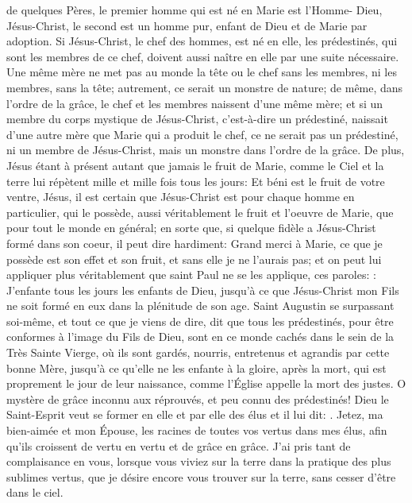 de quelques Pères, le premier homme qui est né en Marie est l'Homme- Dieu, Jésus-Christ, le second est un
homme pur, enfant de Dieu et de Marie par adoption. Si Jésus-Christ, le chef des hommes, est né en elle, les
prédestinés, qui sont les membres de ce chef, doivent aussi naître en elle par une suite nécessaire. Une même
mère ne met pas au monde la tête ou le chef sans les membres, ni les membres, sans la tête; autrement, ce serait
un monstre de nature; de même, dans l'ordre de la grâce, le chef et les membres naissent d'une même mère; et si
un membre du corps mystique de Jésus-Christ, c'est-à-dire un prédestiné, naissait d'une autre mère que Marie qui
a produit le chef, ce ne serait pas un prédestiné, ni un membre de Jésus-Christ, mais un monstre dans l'ordre de la
grâce.
 De plus, Jésus étant à présent autant que jamais le fruit de Marie, comme le Ciel et la terre lui répètent mille et
mille fois tous les jours: Et béni est le fruit de votre ventre, Jésus, il est certain que Jésus-Christ est pour chaque
homme en particulier, qui le possède, aussi véritablement le fruit et l'oeuvre de Marie, que pour tout le monde en
général; en sorte que, si quelque fidèle a Jésus-Christ formé dans son coeur, il peut dire hardiment: Grand merci à
Marie, ce que je possède est son effet et son fruit, et sans elle je ne l'aurais pas; et on peut lui appliquer plus
véritablement que saint Paul ne se les applique, ces paroles: : J'enfante tous les jours les enfants de Dieu, jusqu'à ce que Jésus-Christ mon Fils ne soit formé en eux
dans la plénitude de son age. Saint Augustin se surpassant soi-même, et tout ce que je viens de dire, dit que tous
les prédestinés, pour être conformes à l'image du Fils de Dieu, sont en ce monde cachés dans le sein de la Très
Sainte Vierge, où ils sont gardés, nourris, entretenus et agrandis par cette bonne Mère, jusqu'à ce qu'elle ne les
enfante à la gloire, après la mort, qui est proprement le jour de leur naissance, comme l'Église appelle la mort des
justes. O mystère de grâce inconnu aux réprouvés, et peu connu des prédestinés!
 Dieu le Saint-Esprit veut se former en elle et par elle des élus et il lui dit: . Jetez,
ma bien-aimée et mon Épouse, les racines de toutes vos vertus dans mes élus, afin qu'ils croissent de vertu en
vertu et de grâce en grâce. J'ai pris tant de complaisance en vous, lorsque vous viviez sur la terre dans la pratique
des plus sublimes vertus, que je désire encore vous trouver sur la terre, sans cesser d'être dans le ciel.
